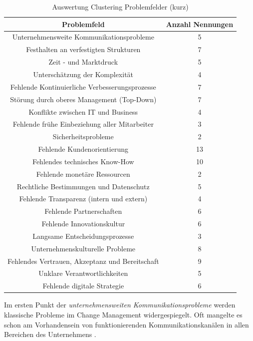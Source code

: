 \begin{table}[ht]
	\centering
	\caption{Auswertung Clustering Problemfelder (kurz)}
	\begin{tabular}{|c|c|}
		\hline
		\textbf{Problemfeld}& \textbf{Anzahl Nennungen} \\
		\hline
		Unternehmensweite Kommunikationsprobleme        & 5  \\
		Festhalten an verfestigten Strukturen           & 7  \\
		Zeit - und Marktdruck                           & 5  \\
		Unterschätzung der Komplexität                  & 4  \\
		Fehlende Kontinuierliche Verbesserungsprozesse  & 7  \\
		Störung durch oberes Management (Top-Down)      & 7  \\
		Konflikte zwischen IT und Business              & 4  \\
		Fehlende frühe Einbeziehung aller Mitarbeiter   & 3  \\
		Sicherheitsprobleme                             & 2  \\
		Fehlende Kundenorientierung                     & 13 \\
		Fehlendes technisches Know-How                  & 10 \\
		Fehlende monetäre Ressourcen                    & 2  \\
		Rechtliche Bestimmungen und Datenschutz         & 5  \\
		Fehlende Transparenz (intern und extern)        & 4  \\
		Fehlende Partnerschaften                        & 6  \\
		Fehlende Innovationskultur                      & 6  \\
		Langsame Entscheidungsprozesse                  & 3  \\
		Unternehmenskulturelle Probleme                 & 8  \\
		Fehlendes Vertrauen, Akzeptanz und Bereitschaft & 9  \\
		Unklare Verantwortlichkeiten                    & 5  \\
		Fehlende digitale Strategie                     & 6 \\
		\hline
	\end{tabular}
	\label{tab:clusteringpfshort}
\end{table}


Im ersten Punkt der \textit{unternehmensweiten Kommunikationsprobleme} werden klassische Probleme im Change Management widergespiegelt. Oft mangelte es schon am Vorhandensein von funktionierenden Kommunikationskanälen in allen Bereichen des Unternehmens \cite[S. 234]{muchna_aspekte_2018}. 

